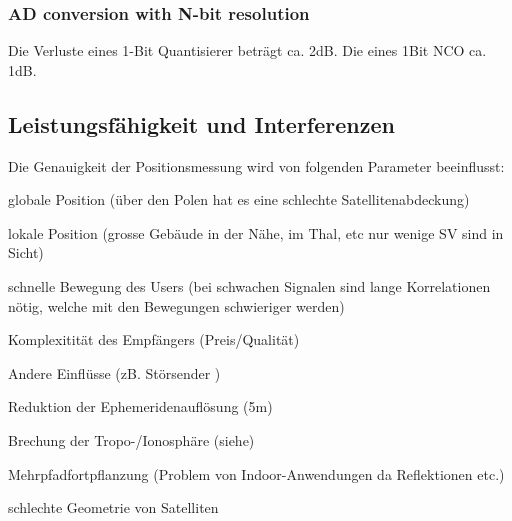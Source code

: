 \subsubsection{AD conversion with N-bit resolution }
	Die Verluste eines 1-Bit Quantisierer beträgt ca. 2dB. Die eines 1Bit NCO ca.
	1dB.

\subsection{Leistungsfähigkeit und Interferenzen}
	Die Genauigkeit der Positionsmessung wird von folgenden Parameter beeinflusst:
	\begin{liste}
    	\item globale Position (über den Polen hat es eine schlechte
    	Satellitenabdeckung)
    	\item lokale Position (grosse Gebäude in der Nähe, im Thal, etc nur wenige
    	SV sind in Sicht)
    	\item schnelle Bewegung des Users (bei schwachen Signalen sind lange
    	Korrelationen nötig, welche mit den Bewegungen schwieriger werden)
    	\item Komplexitität des Empfängers (Preis/Qualität)
    	\item Andere Einflüsse (zB. Störsender )
    	\item Reduktion der Ephemeridenauflösung (5m)
    	\item Brechung der Tropo-/Ionosphäre (siehe)
    	\item Mehrpfadfortpflanzung (Problem von Indoor-Anwendungen da Reflektionen
    	etc.)
    	\item schlechte Geometrie von Satelliten
    \end{liste}

